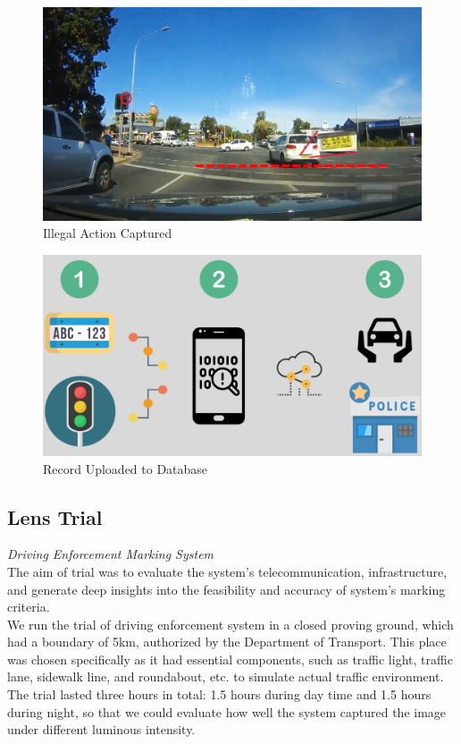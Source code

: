\documentclass{chi-ext}
\begin{document}
\begin{multicols}{2}
\begin{figure}
\centering
 \includegraphics[width=0.7\columnwidth]{illegal.png}
 \caption{Illegal Action Captured}
 \label{fig:illegal}
\end{figure}

\begin{figure}
\centering
 \includegraphics[width=0.7\columnwidth]{datatransform.png}
 \caption{Record Uploaded to Database}
 \label{fig:datatransform}
\end{figure}

\subsection{Lens Trial}
\emph{Driving Enforcement Marking System}\\
The aim of trial was to evaluate the system's telecommunication, infrastructure, and generate deep insights into the feasibility and accuracy of system's marking criteria.\\

We run the trial of driving enforcement system in a closed proving ground, which had a boundary of 5km, authorized by the Department of Transport. This place was chosen specifically as it had essential components, such as traffic light, traffic lane, sidewalk line, and roundabout, etc. to simulate actual traffic environment. The trial lasted three hours in total: 1.5 hours during day time and 1.5 hours during night, so that we could evaluate how well the system captured the image under different luminous intensity.\\


\end{multicols}
\end{document}
